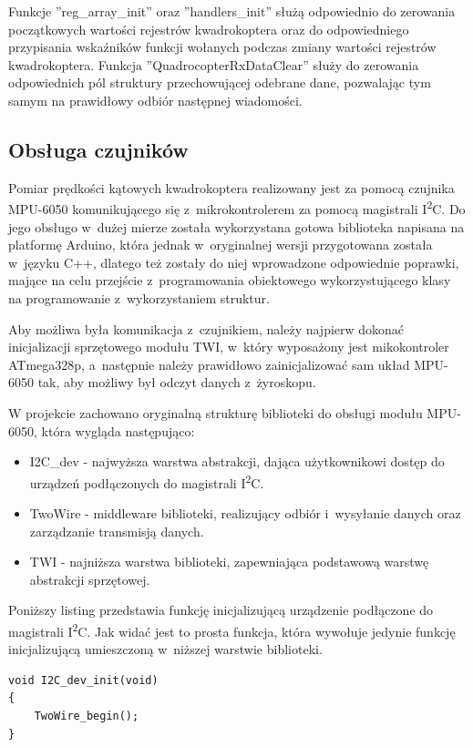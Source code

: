 \documentclass[11pt, twoside]{Thesis} %
\begin{document}
Funkcje ''reg\_array\_init'' oraz ''handlers\_init'' służą odpowiednio do zerowania początkowych wartości rejestrów kwadrokoptera oraz do odpowiedniego przypisania wskaźników funkcji wołanych podczas zmiany wartości rejestrów kwadrokoptera. Funkcja ''QuadrocopterRxDataClear'' służy do zerowania odpowiednich pól struktury przechowującej odebrane dane, pozwalając tym samym na prawidłowy odbiór następnej wiadomości.

\subsection{Obsługa czujników}

Pomiar prędkości kątowych kwadrokoptera realizowany jest za pomocą czujnika MPU-6050 komunikującego się z~mikrokontrolerem za pomocą magistrali I\textsuperscript{2}C. Do jego obsługo w~dużej mierze została wykorzystana gotowa biblioteka napisana na platformę Arduino, która jednak w~oryginalnej wersji przygotowana została w~języku C++, dlatego też zostały do niej wprowadzone odpowiednie poprawki, mające na celu przejście z~programowania obiektowego wykorzystującego klasy na programowanie z~wykorzystaniem struktur. 

Aby możliwa była komunikacja z~czujnikiem, należy najpierw dokonać inicjalizacji sprzętowego modułu TWI, w~który wyposażony jest mikokontroler ATmega328p, a~następnie należy prawidłowo zainicjalizować sam układ MPU-6050 tak, aby możliwy był odczyt danych z~żyroskopu.

W projekcie zachowano oryginalną strukturę biblioteki do obsługi modułu MPU-6050, która wygląda następująco:
\begin{itemize}
	\item I2C\_dev - najwyższa warstwa abstrakcji, dająca użytkownikowi dostęp do urządzeń podłączonych do magistrali I\textsuperscript{2}C.
	\item TwoWire - middleware biblioteki, realizujący odbiór i~wysyłanie danych oraz zarządzanie transmisją danych.
	\item TWI - najniższa warstwa biblioteki, zapewniająca podstawową warstwę abstrakcji sprzętowej.
\end{itemize}

Poniższy listing przedstawia funkcję inicjalizującą urządzenie podłączone do magistrali I\textsuperscript{2}C. Jak widać jest to prosta funkcja, która wywołuje jedynie funkcję inicjalizującą umieszczoną w~niższej warstwie biblioteki.

\begin{lstlisting}
void I2C_dev_init(void)
{
	TwoWire_begin();
}
\end{lstlisting}
\end{document}
